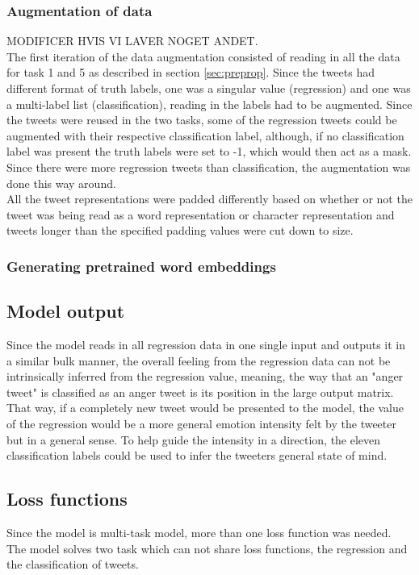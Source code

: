 \subsubsection*{Augmentation of data} \label{sec:augm}
MODIFICER HVIS VI LAVER NOGET ANDET.\\
The first iteration of the data augmentation consisted of reading in all the data for task 1 and 5 as described in section \ref{sec:preprop}. Since the tweets had different format of truth labels, one was a singular value (regression) and one was a multi-label list (classification), reading in the labels had to be augmented. Since the tweets were reused in the two tasks, some of the regression tweets could be augmented with their respective classification label, although, if no classification label was present the truth labels were set to -1, which would then act as a mask. Since there were more regression tweets than classification, the augmentation was done this way around.\\
All the tweet representations were padded differently based on whether or not the tweet was being read as a word representation or character representation and tweets longer than the specified padding values were cut down to size. 

\subsubsection*{Generating pretrained word embeddings}

\subsection{Model output}
Since the model reads in all regression data in one single input and outputs it in a similar bulk manner, the overall feeling from the regression data can not be intrinsically inferred from the regression value, meaning, the way that an "anger tweet" is classified as an anger tweet is its position in the large output matrix. That way, if a completely new tweet would be presented to the model, the value of the regression would be a more general emotion intensity felt by the tweeter but in a general sense. To help guide the intensity in a direction, the eleven classification labels could be used to infer the tweeters general state of mind. 

\subsection{Loss functions}
Since the model is multi-task model, more than one loss function was needed. The model solves two task which can not share loss functions, the regression and the classification of tweets.

